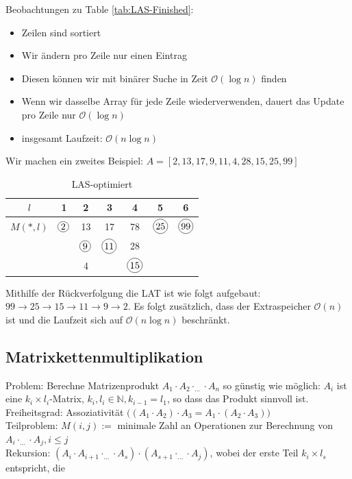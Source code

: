 \documentclass[a4paper]{article}
\newcommand*\circled[1]{\tikz[baseline=(char.base)]{
            \node[shape=circle,draw,inner sep=1.2pt] (char) {#1};}}
\begin{document}
Beobachtungen zu Table \ref{tab:LAS-Finished}: 
\begin{itemize}
    \item Zeilen sind sortiert
    \item Wir ändern pro Zeile nur einen Eintrag
    \item Diesen können wir mit binärer Suche in Zeit $\mathcal{O}(\log n)$ finden
    \item Wenn wir dasselbe Array für jede Zeile wiederverwenden, dauert das Update pro Zeile nur $\mathcal{O}(\log n)$
    \item insgesamt Laufzeit: $\mathcal{O}(n\log n)$
\end{itemize}
Wir machen ein zweites Beispiel: $A = [2, 13, 17, 9, 11, 4, 28, 15, 25, 99]$



\begin{table}[h]
    \centering
    \begin{tabular}{c|cccccc}
        $l$ & 1 & 2 & 3 & 4 & 5 & 6\\
        \hline
        $M(*,l) $ & $\circled{2}$ & 13 & 17  & 78 & $\circled{25}$ & $\circled{99}$\\
         &  & $\circled{9}$ & $\circled{11}$ &  28 & &   \\
         &  & 4 &  &  $\circled{15}$ &  & \\
    \end{tabular}
    \caption{LAS-optimiert}
    \label{tab:LAS-final}
\end{table}

Mithilfe der Rückverfolgung die LAT ist wie folgt aufgebaut: $99 \rightarrow 25 \rightarrow 15 \rightarrow 11 \rightarrow 9 \rightarrow 2$. Es folgt zusätzlich, dass der Extraspeicher $\mathcal{O}(n)$ ist und die Laufzeit sich auf $\mathcal{O}(n\log n)$ beschränkt.


\subsection{Matrixkettenmultiplikation}
Problem: Berechne Matrizenprodukt $A_1\cdot A_2\cdot _{...}  \cdot A_n$ so günstig wie möglich: $A_i$ ist eine $k_i \times l_i$-Matrix, $k_i, l_i \in \mathbb{N}, k_{i-1} = l_1$, so dass das Produkt sinnvoll ist. \\
Freiheitsgrad: Assoziativität $\big((A_1 \cdot A_2) \cdot A_3 = A_1 \cdot (A_2 \cdot A_3) \big) $ \\
Teilproblem: $M(i,j):=$ minimale Zahl an Operationen zur Berechnung von $A_i\cdot _{...} \cdot A_j, i \leq j$ \\
Rekursion: $(A_i\cdot A_{i+1}\cdot _{...} \cdot A_s) \cdot (A_{s+1}\cdot _{...}  \cdot A_j)$,
wobei der erste Teil $k_i \times l_s$ entspricht, die
\end{document}

